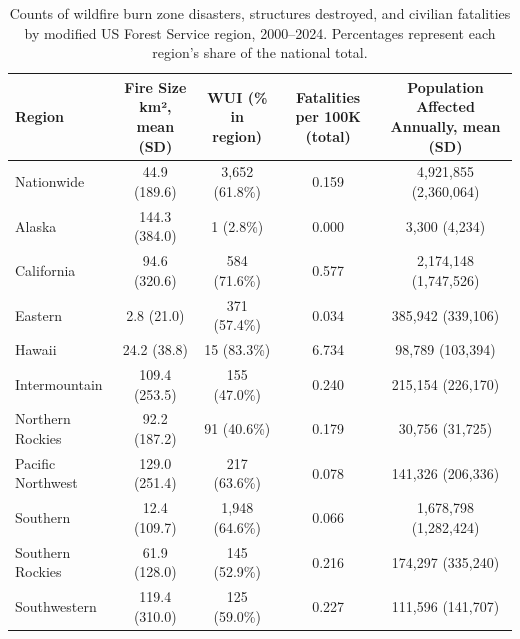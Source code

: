 \begin{table}[H]
\fontsize{6.0pt}{7.2pt}\selectfont
\begin{tabular*}{\linewidth}{@{\extracolsep{\fill}}lcccc}
\toprule
Region & Fire Size km²,
mean (SD) & WUI
(\% in region) & Fatalities per 100K
(total) & Population Affected Annually, mean (SD) \\ 
\midrule\addlinespace[2.5pt]
Nationwide & 44.9 (189.6) & 3,652 (61.8\%) &    0.159 & 4,921,855 (2,360,064) \\ 
Alaska & 144.3 (384.0) &     1 (2.8\%) &    0.000 & 3,300 (4,234) \\ 
California & 94.6 (320.6) &   584 (71.6\%) &    0.577 & 2,174,148 (1,747,526) \\ 
Eastern & 2.8 (21.0) &   371 (57.4\%) &    0.034 & 385,942 (339,106) \\ 
Hawaii & 24.2 (38.8) &    15 (83.3\%) &    6.734 & 98,789 (103,394) \\ 
Intermountain & 109.4 (253.5) &   155 (47.0\%) &    0.240 & 215,154 (226,170) \\ 
Northern Rockies & 92.2 (187.2) &    91 (40.6\%) &    0.179 & 30,756 (31,725) \\ 
Pacific Northwest & 129.0 (251.4) &   217 (63.6\%) &    0.078 & 141,326 (206,336) \\ 
Southern & 12.4 (109.7) & 1,948 (64.6\%) &    0.066 & 1,678,798 (1,282,424) \\ 
Southern Rockies & 61.9 (128.0) &   145 (52.9\%) &    0.216 & 174,297 (335,240) \\ 
Southwestern & 119.4 (310.0) &   125 (59.0\%) &    0.227 & 111,596 (141,707) \\ 
\bottomrule
\end{tabular*}
\caption{Counts of wildfire burn zone disasters, structures destroyed, and civilian fatalities by modified US Forest Service region, 2000--2024. Percentages represent each region's share of the national total.}
\label{tab:fire_description}
\end{table}

